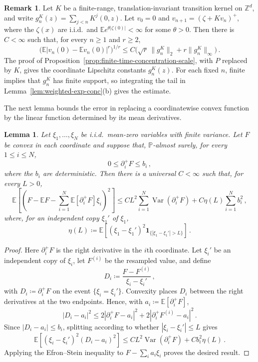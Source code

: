 \documentclass[11pt]{amsart}
\theoremstyle{plain}
\newtheorem{lemma}[theorem]{Lemma}
\theoremstyle{definition}
\newtheorem{remark}[theorem]{Remark}
\newcommand{\Z}{\mathbb{Z}}
\newcommand{\E}{\mathbb{E}}
\renewcommand{\P}{\mathbb{P}}
\DeclareMathOperator{\Var}{Var}
\newcommand{\one}{\mathbf{1}}
\begin{document}
	
	\begin{remark}\label{rem:kernel-concentration}
		Let $K$ be a finite-range, translation-invariant transition kernel on
		$\Z^d$, and write $g_n^K(z)=\sum_{j<n}K^j(0,z)$. Let $v_0=0$ and
		$v_{n+1}=(\zeta+Kv_n)^+$, where the $\zeta(x)$ are i.i.d.\ and
		$\E e^{\theta|\zeta(0)|}<\infty$ for some $\theta>0$. Then there is
		$C<\infty$ such that, for every $n\geq1$ and $r\geq2$,
		\[
			\bigl(\E|v_n(0)-\E v_n(0)|^r\bigr)^{1/r}
			\leq C\bigl(\sqrt r\,\|g_n^K\|_2+r\|g_n^K\|_\infty\bigr)\,.
		\]
		The proof of Proposition~\ref{prop:finite-time-concentration-scale},
		with $P$ replaced by $K$, gives the coordinate Lipschitz constants
		$g_n^K(z)$. For each fixed $n$, finite implies that $g_n^K$ has finite support, so integrating the tail in Lemma~\ref{lem:weighted-exp-conc}\textup{(b)}
		gives the estimate.
	\end{remark}
	

	The next lemma bounds the error in replacing a coordinatewise convex
	function by the linear function determined by its mean derivatives.

	\begin{lemma}\label{lem:convex-linear-bound}
		Let $\xi_1,\ldots,\xi_N$ be i.i.d.\ mean-zero variables with finite
		variance. Let $F$ be convex in each
		coordinate and suppose that, $\P$-almost surely, for every $1\leq i\leq N$,
		\[
			0\leq\partial_i^+F\leq b_i\, ,
		\]
		where the $b_i$ are deterministic. Then there is a universal
		$C<\infty$ such that, for every $L>0$,
		\[
			\E\left[\left(
			F-\E F-\sum_{i=1}^N\E[\partial_i^+F]\xi_i
			\right)^2\right]
			\leq CL^2\sum_{i=1}^N\Var(\partial_i^+F)
			+C\eta(L)\sum_{i=1}^Nb_i^2\, ,
		\]
		where, for an independent copy $\xi_1'$ of $\xi_1$,
		\[
			\eta(L)\coloneqq
			\E\left[(\xi_1-\xi_1')^2
			\one_{\{|\xi_1-\xi_1'|>L\}}\right]\, .
		\]
	\end{lemma}

	\begin{proof}
		Here $\partial_i^+F$ is the right derivative in the $i$th coordinate.
		Let $\xi_i'$ be an independent copy of $\xi_i$, let $F^{(i)}$ be the
		resampled value, and define
		\[
			D_i\coloneqq\frac{F-F^{(i)}}{\xi_i-\xi_i'}\, ,
		\]
		with $D_i\coloneqq\partial_i^+F$ on the event $\{\xi_i=\xi_i'\}$.   
		Convexity places $D_i$ between the right derivatives at the two
		endpoints. Hence, with $a_i\coloneqq\E[\partial_i^+F]$,
		\[
			|D_i-a_i|^2
			\leq
			2|\partial_i^+F-a_i|^2
			+2|\partial_i^+F^{(i)}-a_i|^2\, .
		\]
		Since $|D_i-a_i|\leq b_i$, splitting according to whether
		$|\xi_i-\xi_i'|\leq L$ gives
		\[
			\E\left[(\xi_i-\xi_i')^2(D_i-a_i)^2\right]
			\leq CL^2\Var(\partial_i^+F)+Cb_i^2\eta(L)\, .
		\]
		Applying the Efron--Stein inequality to $F-\sum_i a_i\xi_i$ proves the desired result.
	\end{proof}
\end{document}

